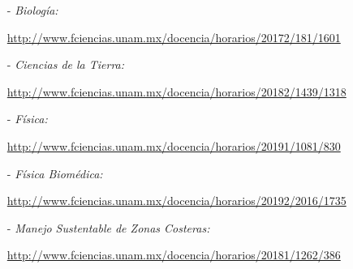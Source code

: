 \begin{itemize}
\item[-] \textit{Biología:}

\url{http://www.fciencias.unam.mx/docencia/horarios/20172/181/1601}

\item[-] \textit{Ciencias de la Tierra:}

\url{http://www.fciencias.unam.mx/docencia/horarios/20182/1439/1318}

\item[-] \textit{Física:}

\url{http://www.fciencias.unam.mx/docencia/horarios/20191/1081/830}

\item[-] \textit{Física Biomédica:}

\url{http://www.fciencias.unam.mx/docencia/horarios/20192/2016/1735}

\item[-] \textit{Manejo Sustentable de Zonas Costeras:}

\url{http://www.fciencias.unam.mx/docencia/horarios/20181/1262/386}

\end{itemize}

